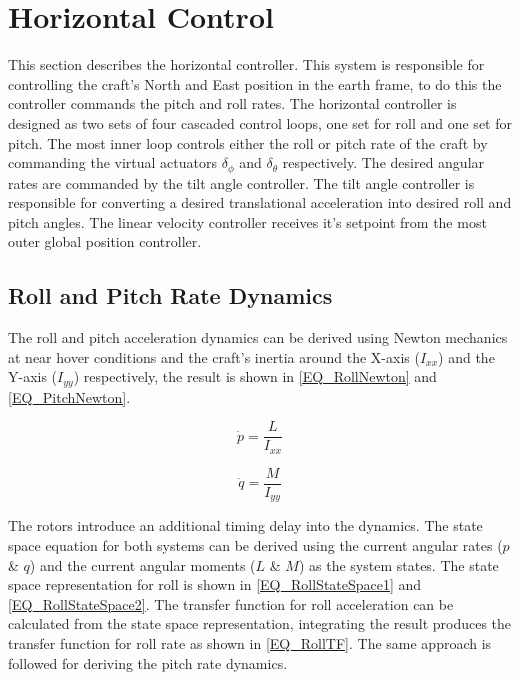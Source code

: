 \documentclass[12pt]{report}
\begin{document}

\section{Horizontal Control}
This section describes the horizontal controller. This system is responsible for controlling the craft's North and East position in the earth frame, to do this the controller commands the pitch and roll rates. The horizontal controller is designed as two sets of four cascaded control loops, one set for roll and one set for pitch. The most inner loop controls either the roll or pitch rate of the craft by commanding the virtual actuators $\delta_\phi$ and $\delta_\theta$ respectively. The desired angular rates are commanded by the tilt angle controller. The tilt angle controller is responsible for converting a desired translational acceleration into desired roll and pitch angles. The linear velocity controller receives it's setpoint from the most outer global position controller. 

\subsection{Roll and Pitch Rate Dynamics}
The roll and pitch acceleration dynamics can be derived using Newton mechanics at near hover conditions and the craft's inertia around the X-axis ($I_{xx}$) and the Y-axis ($I_{yy}$) respectively, the result is shown in \eqref{EQ_RollNewton} and \eqref{EQ_PitchNewton}.

\begin{equation}
\label{EQ_RollNewton}
\dot{p} = \dfrac{L}{I_{xx}}
\end{equation}

\begin{equation}
\label{EQ_PitchNewton}
\dot{q} = \dfrac{M}{I_{yy}}
\end{equation}

The rotors introduce an additional timing delay into the dynamics. The state space equation for both systems can be derived using the current angular rates ($p$ \& $q$) and the current angular moments ($L$ \& $M$) as the system states. The state space representation for roll is shown in \eqref{EQ_RollStateSpace1} and \eqref{EQ_RollStateSpace2}. The transfer function for roll acceleration can be calculated from the state space representation, integrating the result produces the transfer function for roll rate as shown in \eqref{EQ_RollTF}. The same approach is followed for deriving the pitch rate dynamics.
\end{document}
